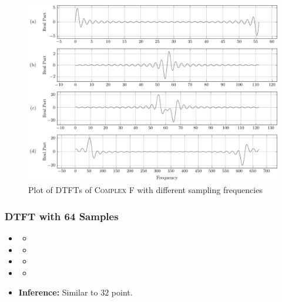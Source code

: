 \documentclass[../../course]{subfiles}
\begin{document}
\vfill

\begin{figure} [H]
    \centering
     {
        \includegraphics[height = 0.8\textheight] {tikzpics/plotDtftComplexF32.pdf}
    }
     {Plot of \textsc{DTFT}s of \textsc{Complex F} with different sampling frequencies}
    \label{plt:dtftComplexF}
\end{figure}

\subsubsection{DTFT with 64 Samples}

\begin{itemize} [label=]

    \item \sampFreqMuchLess
        \begin{itemize} [label=]
            \item
        \end{itemize}

    \item \sampFreqNorm
        \begin{itemize} [label=]
            \item
        \end{itemize}

    \item \sampFreqSligGreat
        \begin{itemize} [label=]
            \item
        \end{itemize}

    \item \sampFreqMuchGreat
        \begin{itemize} [label=]
            \item
        \end{itemize}

    \item \textbf{Inference:} Similar to $32$ point.

\end{itemize}
\end{document}
